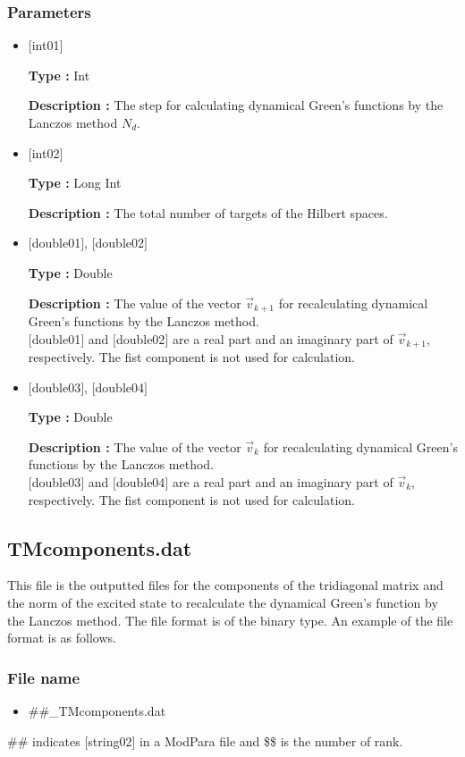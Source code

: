 \subsubsection{Parameters}
 \begin{itemize}

  \item  $[$int01$]$

 {\bf Type :} Int

 {\bf Description :} The step for calculating dynamical Green's functions by the Lanczos method $N_d$.

  \item  $[$int02$]$

 {\bf Type :} Long Int

{\bf Description :}  The total number of targets of the Hilbert spaces.

 
 \item  $[$double01$]$, $[$double02$]$

 {\bf Type :} Double 

{\bf Description :} The value of the vector $\vec{v}_{k+1}$ for recalculating dynamical Green's functions by the Lanczos method.\\
$[$double01$]$ and $[$double02$]$ are a real part and an imaginary part of $\vec{v}_{k+1}$, respectively. The fist component is not used for calculation.

\item  $[$double03$]$, $[$double04$]$

 {\bf Type :} Double 

{\bf Description :} The value of the vector $\vec{v}_{k}$ for recalculating dynamical Green's functions by the Lanczos method.\\
$[$double03$]$ and $[$double04$]$ are a real part and an imaginary part of $\vec{v}_{k}$, respectively. The fist component is not used for calculation.
\end{itemize}

\newpage
\subsection{{TMcomponents.dat}}
This file is the outputted files for the components of the tridiagonal matrix and the norm of the excited state to recalculate  the dynamical Green's function by the Lanczos method.  The file format is of the binary type. An example of the file format is as follows.

\subsubsection{File name}
\begin{itemize}
   \item{\#\#\_TMcomponents.dat}
\end{itemize}
\#\# indicates [string02] in a ModPara file and \$\$ is the number of rank. 

